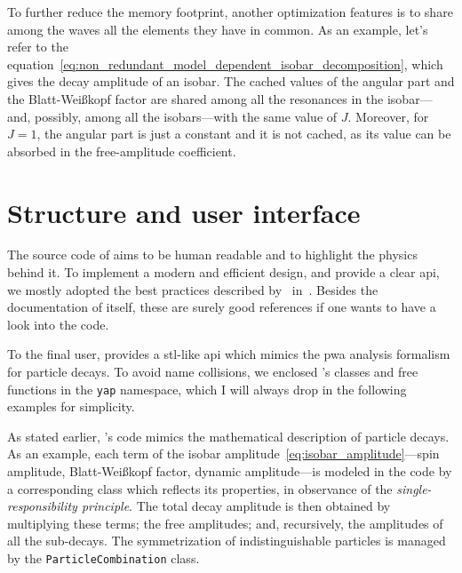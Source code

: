     To further reduce the memory footprint, another optimization  features is to share among the waves all the elements they have in common.
    As an example, let's refer to the equation~\eqref{eq:non_redundant_model_dependent_isobar_decomposition}, which gives the decay amplitude of an isobar.
    The cached values of the angular part and the Blatt-Wei\ss{}kopf factor are shared among all the resonances in the isobar---and, possibly, among all the isobars---with the same value of $J$.
    Moreover, for $J = 1$, the angular part is just a constant and it is not cached, as its value can be absorbed in the free-amplitude coefficient.


    \section{Structure and user interface}

    The source code of  aims to be human readable and to highlight the physics behind it.
    To implement a modern and efficient design, and provide a clear \ac{api}, we mostly adopted the best practices described by~\citeauthor{stl_meyers} in~\cite{stl_meyers,effective_cpp_meyers,effective_modern_cpp_meyers}.
    Besides the documentation of  itself, these are surely good references if one wants to have a look into the code.


    To the final user,  provides a \ac{stl}-like \ac{api} which mimics the \ac{pwa} analysis formalism for particle decays.
    To avoid name collisions, we enclosed 's classes and free functions in the \lstinline!yap! namespace, which I will always drop in the following examples for simplicity.


    As stated earlier, 's code mimics the mathematical description of particle decays.
    As an example, each term of the isobar amplitude~\eqref{eq:isobar_amplitude}---spin amplitude, Blatt-Wei\ss{}kopf factor, dynamic amplitude---is modeled in the code by a corresponding class which reflects its properties, in observance of the \emph{single-responsibility principle}.
    The total decay amplitude is then obtained by multiplying these terms; the free amplitudes; and, recursively, the amplitudes of all the sub-decays.
    The symmetrization of indistinguishable particles is managed by the \lstinline!ParticleCombination! class.


